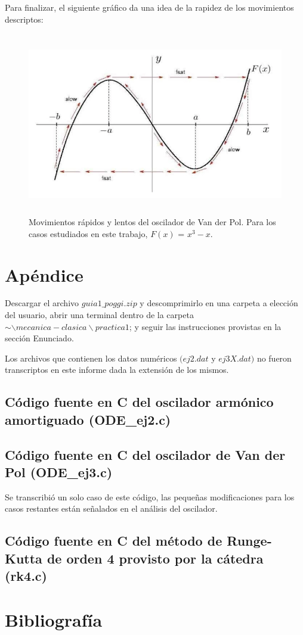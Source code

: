 \documentclass[a4paper,12pt]{article}
\begin{document}
\begin{itemize}
Para finalizar, el siguiente gr\'afico da una idea de la rapidez de los movimientos descriptos:


\begin{figure}[H]
\begin{center}
\includegraphics[height=8cm]{grafico_movimientos.jpg}
\caption[width=5cm]{Movimientos r\'apidos y lentos del oscilador de Van der Pol. Para los casos estudiados en este trabajo, $F(x)$ = $x^3 - x$.}
\end{center}
\end{figure}


\end{itemize}

\section{Ap\'endice}

Descargar el archivo $guia1\_poggi.zip$ y descomprimirlo en una carpeta a elecci\'on del usuario, abrir una terminal dentro de la carpeta $\sim \backslash mecanica-clasica\backslash practica1$; y seguir las instrucciones provistas en la secci\'on Enunciado.

Los archivos que contienen los datos num\'ericos $(ej2.dat$ y $ej3X.dat)$ no fueron transcriptos en este informe dada la extensi\'on de los mismos.


\subsection{C\'odigo fuente en C del oscilador arm\'onico amortiguado (ODE\_ej2.c)}



\subsection{C\'odigo fuente en C del oscilador de Van der Pol (ODE\_ej3.c)}
Se transcribi\'o un solo caso de este c\'odigo, las peque\~nas modificaciones para los casos restantes est\'an se\~nalados en el an\'alisis del oscilador.



\subsection{C\'odigo fuente en C del m\'etodo de Runge-Kutta de orden 4 provisto por la c\'atedra (rk4.c)}


\section{Bibliograf\'ia}
\end{document}
